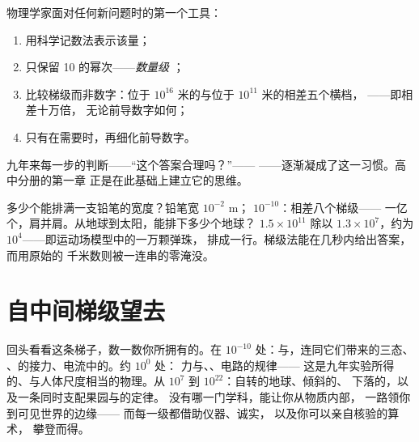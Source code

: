 \begin{method}[用数量级思考]\label{met:g9:atoms-to-galaxies:oom}
物理学家面对任何新问题时的第一个工具：
\begin{enumerate}
  \item 用科学记数法表示该量；
  \item 只保留 10 的幂次——\emph{数量级
        }；
  \item 比较梯级而非数字：位于 $10^{16}$
        米的与位于 $10^{11}$ 米的相差五个横档，
        ——即相差十万倍，
        无论前导数字如何；
  \item 只有在需要时，再细化前导数字。
\end{enumerate}
九年来每一步的判断——“这个答案合理吗？”——
——逐渐凝成了这一习惯。高中分册的第一章
正是在此基础上建立它的思维。
\end{method}

\begin{example}[梯级运算]\label{ex:g9:atoms-to-galaxies:arithmetic}
多少个能排满一支铅笔的宽度？铅笔宽 $10^{-2}$
\unit{m}； $10^{-10}$：相差八个梯级——
一亿个，肩并肩。从地球到太阳，能排下多少个地球？
$1.5 \times 10^{11}$ 除以 $1.3 \times 10^{7}$，约为
$10^{4}$——即运动场模型中的一万颗弹珠，
排成一行。梯级法能在几秒内给出答案，而用原始的
千米数则被一连串的零淹没。
\end{example}

\section{自中间梯级望去}

\begin{remark}[九年所建]\label{rem:g9:atoms-to-galaxies:built}
回头看看这条梯子，数一数你所拥有的。在
$10^{-10}$ 处：与，连同它们带来的三态、
、的接力、电流中的。约 $10^{0}$ 处：
力与、、电路的规律——
这是九年实验所得的、与人体尺度相当的物理。从
$10^{7}$ 到 $10^{22}$：自转的地球、倾斜的、
下落的，以及一条同时支配果园与的定律。
没有哪一门学科，能让你从物质内部，
一路领你到可见世界的边缘——
而每一级都借助仪器、诚实，
以及你可以亲自核验的算术，
攀登而得。
\end{remark}


